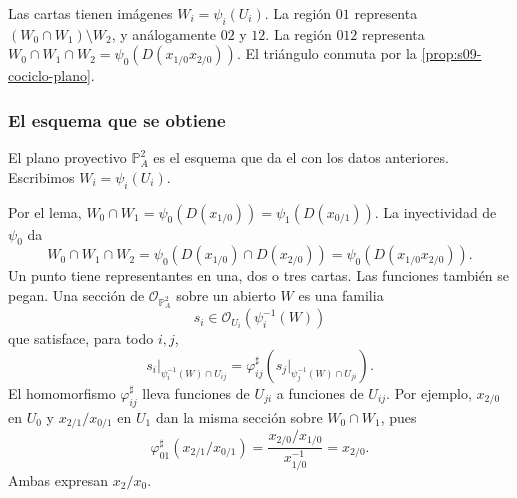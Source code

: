 \par\noindent\begin{minipage}{\linewidth}
\begin{center}
\begin{minipage}{.47\linewidth}
\centering
{}
\end{minipage}\hfill
\begin{minipage}{.50\linewidth}
\centering
{}
\end{minipage}
\end{center}
Las cartas tienen imágenes $W_i=\psi_i(U_i)$. La región $01$ representa $(W_0\cap W_1)\setminus W_2$, y análogamente $02$ y $12$. La región $012$ representa $W_0\cap W_1\cap W_2=\psi_0(D(x_{1/0}x_{2/0}))$. El triángulo conmuta por la \cref{prop:s09-cociclo-plano}.
\end{minipage}\par

\subsubsection{El esquema que se obtiene}

\begin{defi}
\label{defi:s09-plano-proyectivo}
El plano proyectivo $\mathbb P^2_A$ es el esquema que da el  con los datos anteriores. Escribimos $W_i=\psi_i(U_i)$.
\end{defi}

Por el lema, $W_0\cap W_1=\psi_0(D(x_{1/0}))=\psi_1(D(x_{0/1}))$. La inyectividad de $\psi_0$ da
\[
W_0\cap W_1\cap W_2
=\psi_0(D(x_{1/0})\cap D(x_{2/0}))
=\psi_0(D(x_{1/0}x_{2/0})).
\]
Un punto tiene representantes en una, dos o tres cartas. Las funciones también se pegan. Una sección de $\mathcal O_{\mathbb P^2_A}$ sobre un abierto $W$ es una familia
\[
s_i\in\mathcal O_{U_i}(\psi_i^{-1}(W))
\]
que satisface, para todo $i,j$,
\[
s_i|_{\psi_i^{-1}(W)\cap U_{ij}}
=\varphi_{ij}^\sharp\left(s_j|_{\psi_j^{-1}(W)\cap U_{ji}}\right).
\]
El homomorfismo $\varphi_{ij}^\sharp$ lleva funciones de $U_{ji}$ a funciones de $U_{ij}$. Por ejemplo, $x_{2/0}$ en $U_0$ y $x_{2/1}/x_{0/1}$ en $U_1$ dan la misma sección sobre $W_0\cap W_1$, pues
\[
\varphi_{01}^\sharp(x_{2/1}/x_{0/1})
=\frac{x_{2/0}/x_{1/0}}{x_{1/0}^{-1}}=x_{2/0}.
\]
Ambas expresan $x_2/x_0$.

